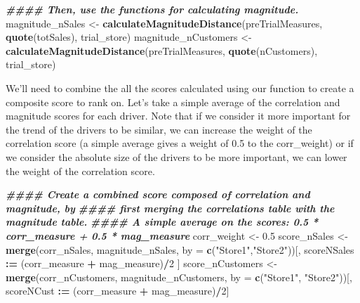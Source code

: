 \documentclass[
]{article}
\newenvironment{Shaded}{\begin{snugshade}}{\end{snugshade}}
\newcommand{\AttributeTok}[1]{\textcolor[rgb]{0.13,0.29,0.53}{#1}}
\newcommand{\DecValTok}[1]{\textcolor[rgb]{0.00,0.00,0.81}{#1}}
\newcommand{\DocumentationTok}[1]{\textcolor[rgb]{0.56,0.35,0.01}{\textbf{\textit{#1}}}}
\newcommand{\FloatTok}[1]{\textcolor[rgb]{0.00,0.00,0.81}{#1}}
\newcommand{\FunctionTok}[1]{\textcolor[rgb]{0.13,0.29,0.53}{\textbf{#1}}}
\newcommand{\NormalTok}[1]{#1}
\newcommand{\OtherTok}[1]{\textcolor[rgb]{0.56,0.35,0.01}{#1}}
\newcommand{\SpecialCharTok}[1]{\textcolor[rgb]{0.81,0.36,0.00}{\textbf{#1}}}
\newcommand{\StringTok}[1]{\textcolor[rgb]{0.31,0.60,0.02}{#1}}
\begin{document}
\begin{Shaded}
\begin{Highlighting}[]
\DocumentationTok{\#\#\#\# Then, use the functions for calculating magnitude.}
\NormalTok{magnitude\_nSales }\OtherTok{\textless{}{-}} \FunctionTok{calculateMagnitudeDistance}\NormalTok{(preTrialMeasures, }\FunctionTok{quote}\NormalTok{(totSales),}
\NormalTok{trial\_store)}
\NormalTok{magnitude\_nCustomers }\OtherTok{\textless{}{-}} \FunctionTok{calculateMagnitudeDistance}\NormalTok{(preTrialMeasures,}
\FunctionTok{quote}\NormalTok{(nCustomers), trial\_store)}
\end{Highlighting}
\end{Shaded}

We'll need to combine the all the scores calculated using our function
to create a composite score to rank on. Let's take a simple average of
the correlation and magnitude scores for each driver. Note that if we
consider it more important for the trend of the drivers to be similar,
we can increase the weight of the correlation score (a simple average
gives a weight of 0.5 to the corr\_weight) or if we consider the
absolute size of the drivers to be more important, we can lower the
weight of the correlation score.

\begin{Shaded}
\begin{Highlighting}[]
\DocumentationTok{\#\#\#\# Create a combined score composed of correlation and magnitude, by}
\DocumentationTok{\#\#\#\# first merging the correlations table with the magnitude table.}
\DocumentationTok{\#\#\#\# A simple average on the scores: 0.5 * corr\_measure + 0.5 * mag\_measure}
\NormalTok{corr\_weight }\OtherTok{\textless{}{-}} \FloatTok{0.5}
\NormalTok{score\_nSales }\OtherTok{\textless{}{-}} \FunctionTok{merge}\NormalTok{(corr\_nSales, magnitude\_nSales, }\AttributeTok{by =} 
          \FunctionTok{c}\NormalTok{(}\StringTok{"Store1"}\NormalTok{,}\StringTok{"Store2"}\NormalTok{))[, scoreNSales }\SpecialCharTok{:=}\NormalTok{ (corr\_measure }\SpecialCharTok{+}\NormalTok{ mag\_measure)}\SpecialCharTok{/}\DecValTok{2}\NormalTok{ ]}
\NormalTok{score\_nCustomers }\OtherTok{\textless{}{-}} \FunctionTok{merge}\NormalTok{(corr\_nCustomers, magnitude\_nCustomers, }\AttributeTok{by =}
        \FunctionTok{c}\NormalTok{(}\StringTok{"Store1"}\NormalTok{, }\StringTok{"Store2"}\NormalTok{))[, scoreNCust }\SpecialCharTok{:=}\NormalTok{ (corr\_measure }\SpecialCharTok{+}\NormalTok{ mag\_measure)}\SpecialCharTok{/}\DecValTok{2}\NormalTok{]}
\end{Highlighting}
\end{Shaded}
\end{document}
